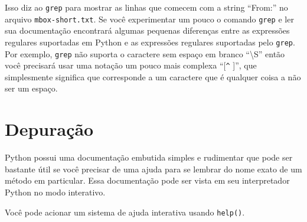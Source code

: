 Isso diz ao {\tt grep} para mostrar as linhas que comecem com a string ``From:'' no arquivo
{\tt mbox-short.txt}. Se você experimentar um pouco o comando {\tt grep} e ler sua documentação 
encontrará algumas pequenas diferenças entre as expressões regulares suportadas em Python e as 
expressões regulares suportadas pelo {\tt grep}. Por exemplo, {\tt grep} não suporta o 
caractere sem espaço em branco ``{\textbackslash}S'' então você precisará usar uma notação um 
pouco mais complexa ``[\verb"^" ]'', que simplesmente significa que corresponde a um caractere 
que é qualquer coisa a não ser um espaço.

\section{Depuração}

Python possui uma documentação embutida simples e rudimentar que pode ser bastante útil se
você precisar de uma ajuda para se lembrar do nome exato de um método em particular.
Essa documentação pode ser vista em seu interpretador Python no modo interativo. 

Você pode acionar um sistema de ajuda interativa usando {\tt help()}.

